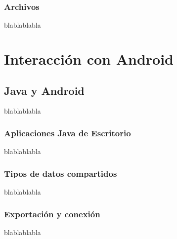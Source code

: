 \documentclass[11pt]{book}
\begin{document}
\section{Archivos}
blablablabla


\part{Interacción con Android}  

\chapter{Java y Android}
blablablabla              
\section{Aplicaciones Java de Escritorio}
blablablabla
\section{Tipos de datos compartidos}
blablablabla
\section{Exportación y conexión}
blablablabla                 





\newpage
\printglossary
\end{document}
